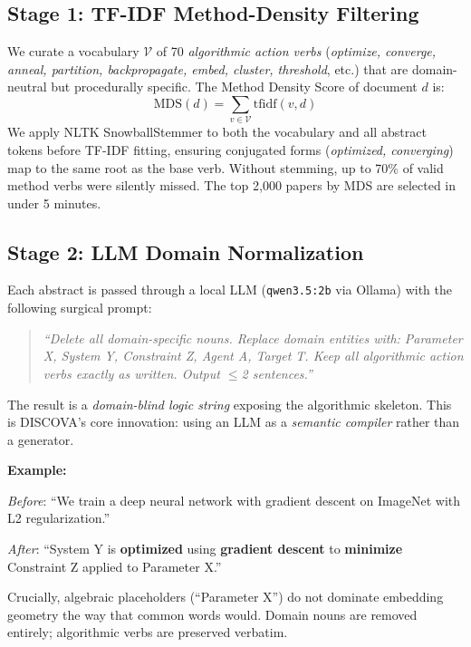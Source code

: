 \documentclass[11pt]{article}
\begin{document}
\subsection{Stage 1: TF-IDF Method-Density Filtering}

We curate a vocabulary $\mathcal{V}$ of 70 \emph{algorithmic action verbs}
(\textit{optimize, converge, anneal, partition, backpropagate, embed, cluster,
threshold}, etc.) that are domain-neutral but procedurally specific.
The Method Density Score of document $d$ is:
\begin{equation}
\text{MDS}(d) = \sum_{v \in \mathcal{V}} \text{tfidf}(v, d)
\label{eq:mds}
\end{equation}
We apply NLTK SnowballStemmer to both the vocabulary and all abstract tokens
before TF-IDF fitting, ensuring conjugated forms
(\textit{optimized, converging}) map to the same root as the base verb.
Without stemming, up to 70\% of valid method verbs were silently missed.
The top 2,000 papers by MDS are selected in under 5 minutes.

\subsection{Stage 2: LLM Domain Normalization}

Each abstract is passed through a local LLM (\texttt{qwen3.5:2b} via Ollama)
with the following surgical prompt:

\begin{quote}
\small\textit{``Delete all domain-specific nouns. Replace domain entities
with: Parameter X, System Y, Constraint Z, Agent A, Target T. Keep all
algorithmic action verbs exactly as written. Output $\leq$2 sentences.''}
\end{quote}

The result is a \emph{domain-blind logic string} exposing the algorithmic
skeleton. This is DISCOVA's core innovation: using an LLM as a
\emph{semantic compiler} rather than a generator.

\vspace{2pt}
\noindent\textbf{Example:}

\noindent\textit{Before}: ``We train a deep neural network with gradient
descent on ImageNet with L2 regularization.''

\noindent\textit{After}: ``System Y is \textbf{optimized} using
\textbf{gradient descent} to \textbf{minimize} Constraint Z applied
to Parameter X.''

\noindent Crucially, algebraic placeholders (``Parameter X'') do not
dominate embedding geometry the way that common words would.
Domain nouns are removed entirely; algorithmic verbs are preserved verbatim.
\end{document}

